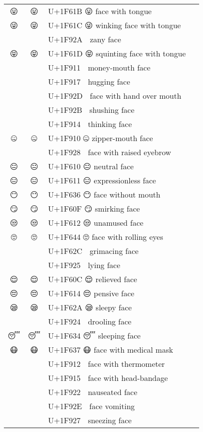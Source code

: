 \documentclass[a4paper,12pt]{ltjarticle}
\newcommand{\fontA}[1]{{\fontspec[RawFeature={mode=harf,dist,ccmp}]{Segoe UI Emoji} #1}}
\newcommand{\fontB}[1]{{\fontspec[RawFeature={mode=harf,dist,ccmp}]{Noto Color Emoji} #1}}
\begin{document}
\begin{longtable}[c]{ccp{0.8\linewidth}}
\fontA{😛}&\fontB{😛}&U+1F61B 😛 face with tongue\\
\fontA{😜}&\fontB{😜}&U+1F61C 😜 winking face with tongue\\
\fontA{🤪}&\fontB{🤪}&U+1F92A 🤪 zany face\\
\fontA{😝}&\fontB{😝}&U+1F61D 😝 squinting face with tongue\\
\fontA{🤑}&\fontB{🤑}&U+1F911 🤑 money-mouth face\\
\fontA{🤗}&\fontB{🤗}&U+1F917 🤗 hugging face\\
\fontA{🤭}&\fontB{🤭}&U+1F92D 🤭 face with hand over mouth\\
\fontA{🤫}&\fontB{🤫}&U+1F92B 🤫 shushing face\\
\fontA{🤔}&\fontB{🤔}&U+1F914 🤔 thinking face\\
\fontA{🤐}&\fontB{🤐}&U+1F910 🤐 zipper-mouth face\\
\fontA{🤨}&\fontB{🤨}&U+1F928 🤨 face with raised eyebrow\\
\fontA{😐}&\fontB{😐}&U+1F610 😐 neutral face\\
\fontA{😑}&\fontB{😑}&U+1F611 😑 expressionless face\\
\fontA{😶}&\fontB{😶}&U+1F636 😶 face without mouth\\
\fontA{😏}&\fontB{😏}&U+1F60F 😏 smirking face\\
\fontA{😒}&\fontB{😒}&U+1F612 😒 unamused face\\
\fontA{🙄}&\fontB{🙄}&U+1F644 🙄 face with rolling eyes\\
\fontA{😬}&\fontB{😬}&U+1F62C 😬 grimacing face\\
\fontA{🤥}&\fontB{🤥}&U+1F925 🤥 lying face\\
\fontA{😌}&\fontB{😌}&U+1F60C 😌 relieved face\\
\fontA{😔}&\fontB{😔}&U+1F614 😔 pensive face\\
\fontA{😪}&\fontB{😪}&U+1F62A 😪 sleepy face\\
\fontA{🤤}&\fontB{🤤}&U+1F924 🤤 drooling face\\
\fontA{😴}&\fontB{😴}&U+1F634 😴 sleeping face\\
\fontA{😷}&\fontB{😷}&U+1F637 😷 face with medical mask\\
\fontA{🤒}&\fontB{🤒}&U+1F912 🤒 face with thermometer\\
\fontA{🤕}&\fontB{🤕}&U+1F915 🤕 face with head-bandage\\
\fontA{🤢}&\fontB{🤢}&U+1F922 🤢 nauseated face\\
\fontA{🤮}&\fontB{🤮}&U+1F92E 🤮 face vomiting\\
\fontA{🤧}&\fontB{🤧}&U+1F927 🤧 sneezing face\\

\end{longtable}
\end{document}
